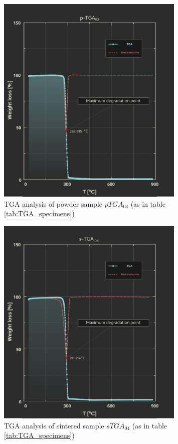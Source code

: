 \documentclass{article}
\begin{document}
        \begin{figure}[ht]
            \centering
            \includegraphics[width=0.8\textwidth]{Pictures/Thermal_analysis_plots/TGA_catalogued/Fixed/p-TGA03.pdf}
            \caption{TGA analysis of powder sample $pTGA_{03}$ (as in table \ref{tab:TGA_specimens})}
            \label{fig:TGA_03}
        \end{figure}

            \begin{figure}[ht]
                \centering
                \includegraphics[width=0.8\textwidth]{Pictures/Thermal_analysis_plots/TGA_catalogued/Fixed/s-TGA04.pdf}
                \caption{TGA analysis of sintered sample $sTGA_{04}$ (as in table \ref{tab:TGA_specimens})}
                \label{fig:TGA_04}
            \end{figure}
\end{document}
